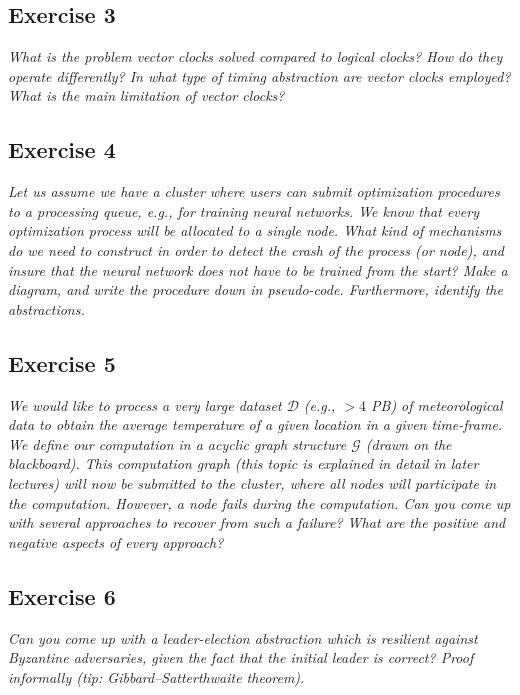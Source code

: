 \subsection*{Exercise 3}
\label{sec:exercise_3}

\emph{What is the problem vector clocks solved compared to logical clocks? How do they operate differently? In what type of timing abstraction are vector clocks employed? What is the main limitation of vector clocks?}

\subsection*{Exercise 4}
\label{sec:exercise_4}

\emph{Let us assume we have a cluster where users can submit optimization procedures to a processing queue, e.g., for training neural networks. We know that every optimization process will be allocated to a single node. What kind of mechanisms do we need to construct in order to detect the crash of the process (or node), and insure that the neural network does not have to be trained from the start? Make a diagram, and write the procedure down in pseudo-code. Furthermore, identify the abstractions.}

\subsection*{Exercise 5}
\label{sec:exercise_5}

\emph{We would like to process a very large dataset $\mathcal{D}$ (e.g., $> 4$ PB) of meteorological data to obtain the average temperature of a given location in a given time-frame. We define our computation in a acyclic graph structure $\mathcal{G}$ (drawn on the blackboard). This computation graph (this topic is explained in detail in later lectures) will now be submitted to the cluster, where all nodes will participate in the computation. However, a node fails during the computation. Can you come up with several approaches to recover from such a failure? What are the positive and negative aspects of every approach?}

\subsection*{Exercise 6}
\label{sec:exercise_6}

\emph{Can you come up with a leader-election abstraction which is resilient against Byzantine adversaries, given the fact that the initial leader is correct? Proof informally (tip: Gibbard–Satterthwaite theorem).}


